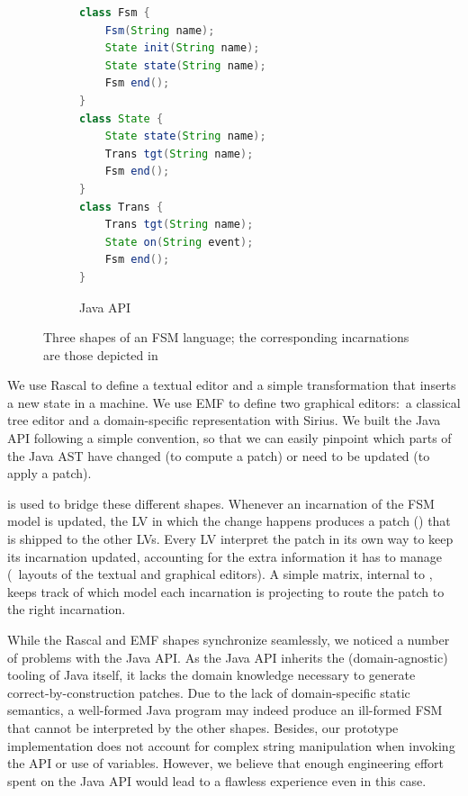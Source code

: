 \begin{figure}[bt]
	\enskip
	\vrule
	\enskip
	\begin{subfigure}[b]{.35\columnwidth}
		\begin{lstlisting}[label=lst:fsm-api, language=Java, numbers=none, xleftmargin=0pt, tabsize=1]
class Fsm {
	Fsm(String name);
	State init(String name);
	State state(String name);
	Fsm end();
}
class State {
	State state(String name);
	Trans tgt(String name);
	Fsm end();
}
class Trans {
	Trans tgt(String name);
	State on(String event);
	Fsm end();
}
		\end{lstlisting}
		\caption{Java API}
	\end{subfigure}
	\caption{Three shapes of an FSM language; the corresponding incarnations are those depicted in }
	\label{fig:3fsms}
\end{figure}

We use Rascal to define a textual editor and a simple transformation that inserts a new state in a machine.
We use EMF to define two graphical editors:~a classical tree editor and a domain-specific representation with Sirius.
We built the Java API following a simple convention, so that we can easily pinpoint which parts of the Java AST have changed (to compute a patch) or need to be updated (to apply a patch).

\prism is used to bridge these different shapes.
Whenever an incarnation of the FSM model is updated, the LV in which the change happens produces a patch (\cf{}) that is shipped to the other LVs.
Every LV interpret the patch in its own way to keep its incarnation updated, accounting for the extra information it has to manage (\eg~layouts of the textual and graphical editors).
A simple matrix, internal to \prism, keeps track of which model each incarnation is projecting to route the patch to the right incarnation.


While the Rascal and EMF shapes synchronize seamlessly, we noticed a number of problems with the Java API.
As the Java API inherits the (domain-agnostic) tooling of Java itself, it lacks the domain knowledge necessary to generate correct-by-construction patches.
Due to the lack of domain-specific static semantics, a well-formed Java program may indeed produce an ill-formed FSM that cannot be interpreted by the other shapes.
Besides, our prototype implementation does not account for complex string manipulation when invoking the API or use of variables.
However, we believe that enough engineering effort spent on the Java API would lead to a flawless experience even in this case.

